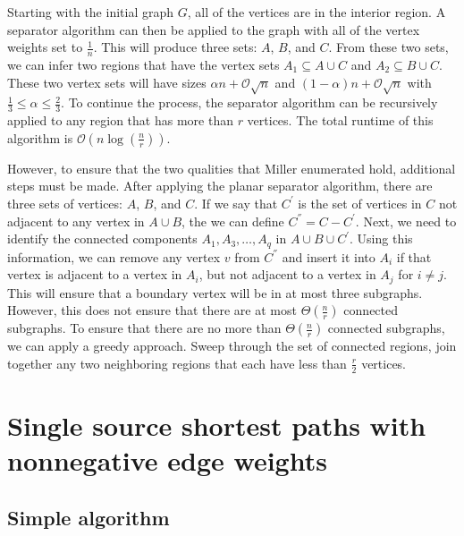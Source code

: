 \documentclass[12pt]{article}
\begin{document}
    Starting with the initial graph $G$, all of the vertices are in the interior region. A separator algorithm can then be applied to the graph with all of the vertex weights set to $\frac{1}{n}$. This will produce three sets: $A$, $B$, and $C$. From these two sets, we can infer two regions that have the vertex sets $A_1 \subseteq A \cup C$ and $A_2 \subseteq B \cup C$. These two vertex sets will have sizes $\alpha n + \mathcal{O}\sqrt{n}$ and $(1 - \alpha) n + \mathcal{O}\sqrt{n}$ with $\frac{1}{3} \leq \alpha \leq \frac{2}{3}$. To continue the process, the separator algorithm can be recursively applied to any region that has more than $r$ vertices. The total runtime of this algorithm is $\mathcal{O} \left (n \log \left (\frac{n}{r} \right ) \right )$.


    However, to ensure that the two qualities that Miller enumerated hold, additional steps must be made. After applying the planar separator algorithm, there are three sets of vertices: $A$, $B$, and $C$. If we say that $C^{'}$ is the set of vertices in $C$ not adjacent to any vertex in $A \cup B$, the we can define $C^{''} = C - C^{'}$. Next, we need to identify the connected components $A_1, A_3, \ldots, A_q$ in $A \cup B \cup C^{'}$. Using this information, we can remove any vertex $v$ from $C^{''}$ and insert it into $A_i$ if that vertex is adjacent to a vertex in $A_i$, but not adjacent to a vertex in $A_j$ for $i \neq j$. This will ensure that a boundary vertex will be in at most three subgraphs. However, this does not ensure that there are at most $\Theta \left ( \frac{n}{r} \right )$ connected subgraphs. To ensure that there are no more than $\Theta \left ( \frac{n}{r} \right )$ connected subgraphs, we can apply a greedy approach. Sweep through the set of connected regions, join together any two neighboring regions that each have less than $\frac{r}{2}$ vertices.

\section{Single source shortest paths with nonnegative edge weights}
\label{sec:nonn-edge-weights}

\subsection{Simple algorithm}
\label{sec:simple-algorithm}
\end{document}
